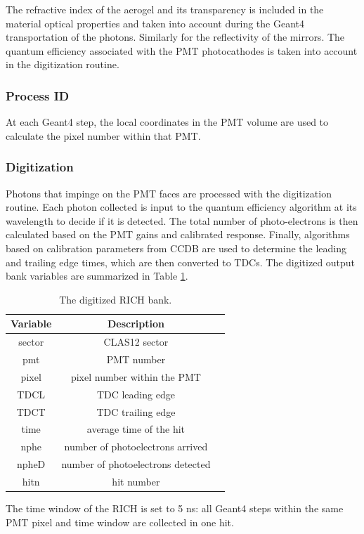 The refractive index of the aerogel and its transparency is included in the material optical properties and taken
into account during the Geant4 transportation of the photons.
Similarly for the reflectivity of the mirrors. The quantum efficiency associated with the PMT photocathodes is taken into account in the digitization routine.

\subsubsection{Process ID}
At each Geant4 step, the local coordinates in the PMT volume are used to calculate the pixel number within that PMT.

\subsubsection{Digitization}

Photons that impinge on the PMT faces are processed with the digitization routine.
Each photon collected is input to the quantum efficiency algorithm at its wavelength to decide if it is detected.
The total number of photo-electrons is then calculated based on the PMT gains and calibrated response.
Finally, algorithms based on calibration parameters from CCDB are used to determine the leading and trailing edge times, which are
then converted to TDCs.
The digitized output bank variables are summarized in Table \ref{tab:richBank}.

\begin{table}[h]
	\begin{center}
		\begin{tabular}{| c | c | c |}
			\hline \hline
			Variable & Description                                         \\
			\hline
             sector  &                                     CLAS12 sector   \\
                pmt  &                                        PMT number   \\
              pixel  &                       pixel number within the PMT   \\
               TDCL  &                                  TDC leading edge   \\
               TDCT  &                                 TDC trailing edge   \\
               time  &                           average time of the hit   \\
               nphe  &                  number of photoelectrons arrived   \\
              npheD  &                 number of photoelectrons detected   \\
               hitn  &                                        hit number   \\
			\hline \hline
		\end{tabular}
	\end{center}
	\caption{The digitized RICH bank.}\label{tab:richBank}
\end{table}

The time window  of the RICH is set to 5 ns: all Geant4 steps within the same PMT pixel and time window are collected in one hit.
